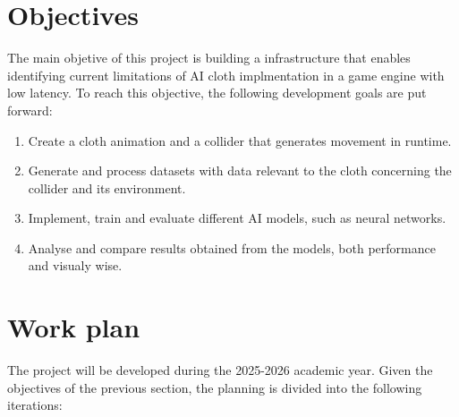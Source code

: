 \section*{Objectives}
The main objetive of this project is building a infrastructure that enables identifying current limitations of AI cloth implmentation in a game engine with low latency. To reach this objective, the following development goals are put forward:
\begin{enumerate}
	\item Create a cloth animation and a collider that generates movement in runtime.
	\item Generate and process datasets with data relevant to the cloth concerning the collider and its environment.
	\item Implement, train and evaluate different AI models, such as neural networks. 
	\item Analyse and compare results obtained from the models, both performance and visualy wise.
\end{enumerate}


\section*{Work plan}
The project will be developed during the 2025-2026 academic year.
Given the objectives of the previous section, the planning is divided into the following iterations:

